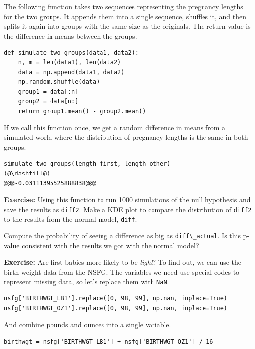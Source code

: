 The following function takes two sequences representing the pregnancy
lengths for the two groups. It appends them into a single sequence,
shuffles it, and then splits it again into groups with the same size as
the originals. The return value is the difference in means between the
groups.

\begin{lstlisting}[]
def simulate_two_groups(data1, data2):
    n, m = len(data1), len(data2)
    data = np.append(data1, data2)
    np.random.shuffle(data)
    group1 = data[:n]
    group2 = data[n:]
    return group1.mean() - group2.mean()
\end{lstlisting}

If we call this function once, we get a random difference in means from
a simulated world where the distribution of pregnancy lengths is the
same in both groups.

\begin{lstlisting}[]
simulate_two_groups(length_first, length_other)
(@\dashfill@)
@@@-0.03111395525888838@@@
\end{lstlisting}

\textbf{Exercise:} Using this function to run 1000 simulations of the
null hypothesis and save the results as \passthrough{\lstinline!diff2!}.
Make a KDE plot to compare the distribution of
\passthrough{\lstinline!diff2!} to the results from the normal model,
\passthrough{\lstinline!diff!}.

Compute the probability of seeing a difference as big as
\passthrough{\lstinline!diff\_actual!}. Is this p-value consistent with
the results we got with the normal model?

\textbf{Exercise:} Are first babies more likely to be \emph{light}? To
find out, we can use the birth weight data from the NSFG. The variables
we need use special codes to represent missing data, so let's replace
them with \passthrough{\lstinline!NaN!}.

\begin{lstlisting}[]
nsfg['BIRTHWGT_LB1'].replace([0, 98, 99], np.nan, inplace=True)
nsfg['BIRTHWGT_OZ1'].replace([0, 98, 99], np.nan, inplace=True)
\end{lstlisting}

And combine pounds and ounces into a single variable.

\begin{lstlisting}[]
birthwgt = nsfg['BIRTHWGT_LB1'] + nsfg['BIRTHWGT_OZ1'] / 16
\end{lstlisting}

